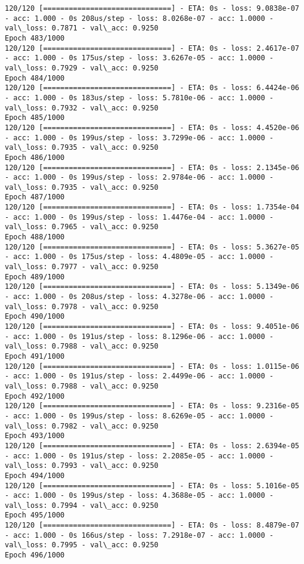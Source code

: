 \documentclass[11pt]{article}
\begin{document}
\begin{Verbatim}[commandchars=\\\{\}]
120/120 [==============================] - ETA: 0s - loss: 9.0838e-07 - acc: 1.000 - 0s 208us/step - loss: 8.0268e-07 - acc: 1.0000 - val\_loss: 0.7871 - val\_acc: 0.9250
Epoch 483/1000
120/120 [==============================] - ETA: 0s - loss: 2.4617e-07 - acc: 1.000 - 0s 175us/step - loss: 3.6267e-05 - acc: 1.0000 - val\_loss: 0.7929 - val\_acc: 0.9250
Epoch 484/1000
120/120 [==============================] - ETA: 0s - loss: 6.4424e-06 - acc: 1.000 - 0s 183us/step - loss: 5.7810e-06 - acc: 1.0000 - val\_loss: 0.7932 - val\_acc: 0.9250
Epoch 485/1000
120/120 [==============================] - ETA: 0s - loss: 4.4520e-06 - acc: 1.000 - 0s 199us/step - loss: 3.7299e-06 - acc: 1.0000 - val\_loss: 0.7935 - val\_acc: 0.9250
Epoch 486/1000
120/120 [==============================] - ETA: 0s - loss: 2.1345e-06 - acc: 1.000 - 0s 199us/step - loss: 2.9784e-06 - acc: 1.0000 - val\_loss: 0.7935 - val\_acc: 0.9250
Epoch 487/1000
120/120 [==============================] - ETA: 0s - loss: 1.7354e-04 - acc: 1.000 - 0s 199us/step - loss: 1.4476e-04 - acc: 1.0000 - val\_loss: 0.7965 - val\_acc: 0.9250
Epoch 488/1000
120/120 [==============================] - ETA: 0s - loss: 5.3627e-05 - acc: 1.000 - 0s 175us/step - loss: 4.4809e-05 - acc: 1.0000 - val\_loss: 0.7977 - val\_acc: 0.9250
Epoch 489/1000
120/120 [==============================] - ETA: 0s - loss: 5.1349e-06 - acc: 1.000 - 0s 208us/step - loss: 4.3278e-06 - acc: 1.0000 - val\_loss: 0.7978 - val\_acc: 0.9250
Epoch 490/1000
120/120 [==============================] - ETA: 0s - loss: 9.4051e-06 - acc: 1.000 - 0s 191us/step - loss: 8.1296e-06 - acc: 1.0000 - val\_loss: 0.7988 - val\_acc: 0.9250
Epoch 491/1000
120/120 [==============================] - ETA: 0s - loss: 1.0115e-06 - acc: 1.000 - 0s 191us/step - loss: 2.4499e-06 - acc: 1.0000 - val\_loss: 0.7988 - val\_acc: 0.9250
Epoch 492/1000
120/120 [==============================] - ETA: 0s - loss: 9.2316e-05 - acc: 1.000 - 0s 199us/step - loss: 8.6269e-05 - acc: 1.0000 - val\_loss: 0.7982 - val\_acc: 0.9250
Epoch 493/1000
120/120 [==============================] - ETA: 0s - loss: 2.6394e-05 - acc: 1.000 - 0s 191us/step - loss: 2.2085e-05 - acc: 1.0000 - val\_loss: 0.7993 - val\_acc: 0.9250
Epoch 494/1000
120/120 [==============================] - ETA: 0s - loss: 5.1016e-05 - acc: 1.000 - 0s 199us/step - loss: 4.3688e-05 - acc: 1.0000 - val\_loss: 0.7994 - val\_acc: 0.9250
Epoch 495/1000
120/120 [==============================] - ETA: 0s - loss: 8.4879e-07 - acc: 1.000 - 0s 166us/step - loss: 7.2918e-07 - acc: 1.0000 - val\_loss: 0.7995 - val\_acc: 0.9250
Epoch 496/1000

\end{Verbatim}
\end{document}
